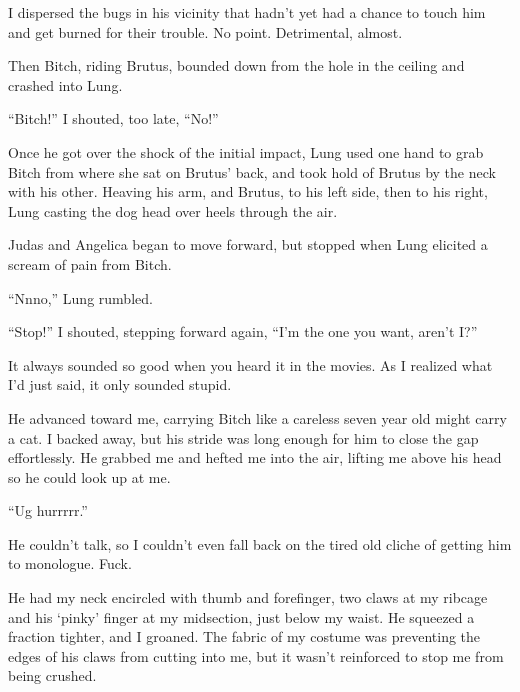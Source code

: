 I dispersed the bugs in his vicinity that hadn't yet had a chance to touch him and get burned for their trouble.  No point.  Detrimental, almost.



Then Bitch, riding Brutus, bounded down from the hole in the ceiling and crashed into Lung.



``Bitch!'' I shouted, too late, ``No!''



Once he got over the shock of the initial impact, Lung used one hand to grab Bitch from where she sat on Brutus' back, and took hold of Brutus by the neck with his other.  Heaving his arm, and Brutus, to his left side, then to his right, Lung casting the dog head over heels through the air.



Judas and Angelica began to move forward, but stopped when Lung elicited a scream of pain from Bitch.



``Nnno,'' Lung rumbled.



``Stop!'' I shouted, stepping forward again, ``I'm the one you want, aren't I?''



It always sounded so good when you heard it in the movies.  As I realized what I'd just said, it only sounded stupid.



He advanced toward me, carrying Bitch like a careless seven year old might carry a cat.  I backed away, but his stride was long enough for him to close the gap effortlessly.  He grabbed me and hefted me into the air, lifting me above his head so he could look up at me.



``Ug hurrrrr.''



He couldn't talk, so I couldn't even fall back on the tired old cliche of getting him to monologue.  Fuck.



He had my neck encircled with thumb and forefinger, two claws at my ribcage and his `pinky' finger at my midsection, just below my waist.  He squeezed a fraction tighter, and I groaned.  The fabric of my costume was preventing the edges of his claws from cutting into me, but it wasn't reinforced to stop me from being crushed.



